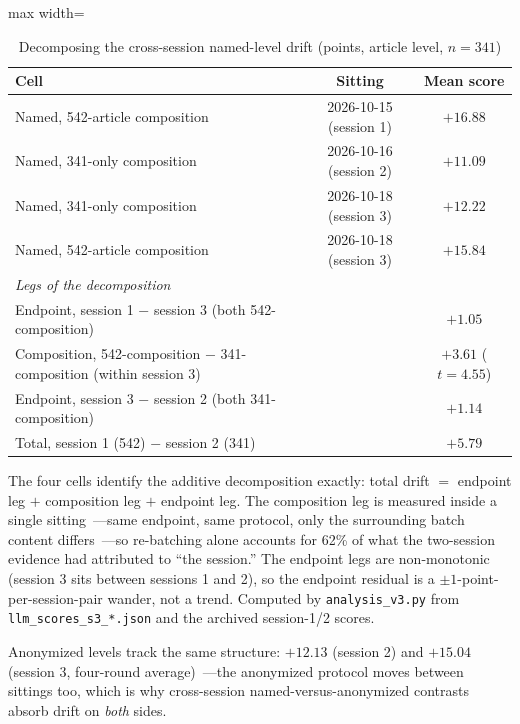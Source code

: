 \begin{table}[htbp]
\centering
\small
\caption{Decomposing the cross-session named-level drift (points, article level, $n=341$)}
\label{tab:comp}
\begin{adjustbox}{max width=\textwidth}
\begin{tabular}{lcc}
\toprule
Cell & Sitting & Mean score \\
\midrule
Named, 542-article composition & 2026-10-15 (session 1) & $+16.88$ \\
Named, 341-only composition & 2026-10-16 (session 2) & $+11.09$ \\
Named, 341-only composition & 2026-10-18 (session 3) & $+12.22$ \\
Named, 542-article composition & 2026-10-18 (session 3) & $+15.84$ \\
\midrule
\multicolumn{3}{l}{\emph{Legs of the decomposition}} \\
Endpoint, session 1 $-$ session 3 (both 542-composition) & & $+1.05$ \\
Composition, 542-composition $-$ 341-composition (within session 3) & & $+3.61$ ($t=4.55$) \\
Endpoint, session 3 $-$ session 2 (both 341-composition) & & $+1.14$ \\
Total, session 1 (542) $-$ session 2 (341) & & $+5.79$ \\
\bottomrule
\end{tabular}
\end{adjustbox}
\begin{tablenotes}[flushleft]\footnotesize
\item The four cells identify the additive decomposition exactly: total drift $=$ endpoint leg $+$ composition leg $+$ endpoint leg. The composition leg is measured inside a single sitting~---same endpoint, same protocol, only the surrounding batch content differs~---so re-batching alone accounts for 62\% of what the two-session evidence had attributed to ``the session.'' The endpoint legs are non-monotonic (session 3 sits between sessions 1 and 2), so the endpoint residual is a $\pm1$-point-per-session-pair wander, not a trend. Computed by \texttt{analysis\_v3.py} from \texttt{llm\_scores\_s3\_*.json} and the archived session-1/2 scores.
\end{tablenotes}
\end{table}

Anonymized levels track the same structure: $+12.13$ (session 2) and $+15.04$ (session 3, four-round average)~---the anonymized protocol moves between sittings too, which is why cross-session named-versus-anonymized contrasts absorb drift on \emph{both} sides.

